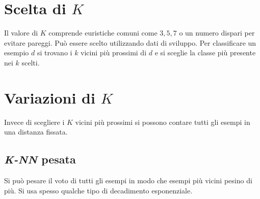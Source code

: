 \section{Scelta di $K$}
Il valore di $K$ comprende euristiche comuni come $3, 5, 7$ o un numero dispari per evitare pareggi.
Pu\`o essere scelto utilizzando dati di sviluppo.
Per classificare un esempio $d$ si trovano i $k$ vicini pi\`u prossimi di $d$ e si sceglie la classe pi\`u presente nei $k$ scelti.

\section{Variazioni di $K$}
Invece di scegliere i $K$ vicini pi\`u prossimi si possono contare tutti gli esempi in una distanza fissata.

	\subsection{\emph{K-NN} pesata}
	Si pu\`o pesare il voto di tutti gli esempi in modo che esempi pi\`u vicini pesino di pi\`u.
	Si usa spesso qualche tipo di decadimento esponenziale.
